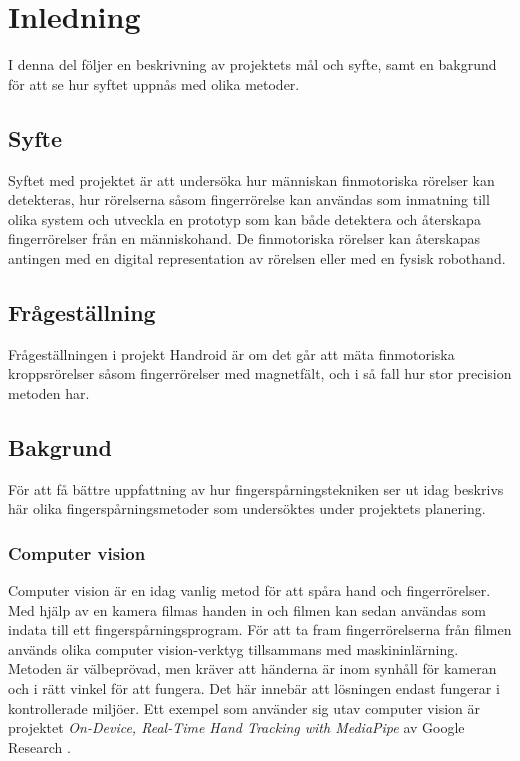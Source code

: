 \documentclass[a4paper]{article}
\begin{document}
\begin{sloppypar}

    \section{Inledning}
    I denna del följer en beskrivning av projektets mål och syfte, samt en bakgrund för att se hur syftet uppnås med olika metoder.
    \subsection{Syfte}
    Syftet med projektet är att undersöka hur människan finmotoriska rörelser kan detekteras, hur rörelserna såsom fingerrörelse kan användas som inmatning till olika system
    och utveckla en prototyp som kan både detektera och återskapa fingerrörelser från en människohand.
    De finmotoriska rörelser kan återskapas antingen med en digital representation av rörelsen eller med en fysisk robothand.

    \subsection{Frågeställning}
    Frågeställningen i projekt Handroid är om det går att mäta finmotoriska kroppsrörelser såsom fingerrörelser med magnetfält, och i så fall hur stor precision metoden har.

    \subsection{Bakgrund}
    För att få bättre uppfattning av hur fingerspårningstekniken ser ut idag beskrivs här olika fingerspårningsmetoder som undersöktes under projektets planering.

    \subsubsection{Computer vision}
    Computer vision är en idag vanlig metod för att spåra hand och fingerrörelser. Med hjälp av en kamera filmas handen in och filmen kan sedan användas som indata till ett fingerspårningsprogram.
    För att ta fram fingerrörelserna från filmen används olika computer vision-verktyg tillsammans med maskininlärning. Metoden är välbeprövad, men kräver  att
    händerna är inom synhåll för kameran och i rätt vinkel för att fungera. Det här innebär att lösningen endast fungerar
    i kontrollerade miljöer. Ett exempel som använder sig utav computer vision är projektet \textit{On-Device, Real-Time Hand Tracking with MediaPipe}
    av Google Research \cite{google:Hand_Tracking}.


\end{sloppypar}
\end{document}
